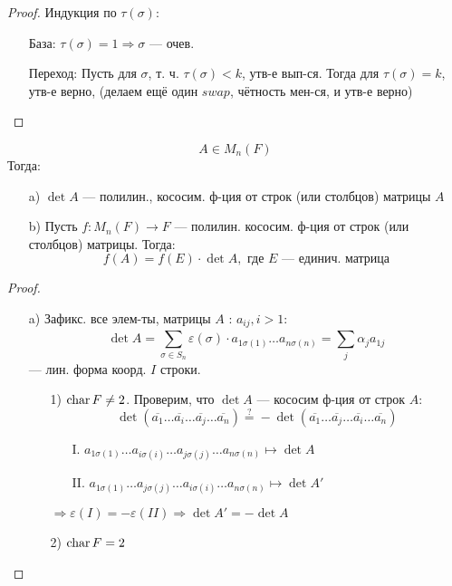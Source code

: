 \begin{proof}
  Индукция по $\tau(\sigma)$:
  \begin{itemize}
    \item [База: ] $\tau(\sigma) = 1 \Rightarrow \sigma$ --- очев.
    \item [Переход:] Пусть для $\sigma$, т. ч. $\tau(\sigma) < k$, утв-е вып-ся. Тогда для $\tau(\sigma) = k$, утв-е верно, (делаем ещё один $swap$, чётность мен-ся, и утв-е верно)
  \end{itemize}
\end{proof}
\begin{theorem}
\label{th:polilin_and_kos_1}
\[
A \in M_n(F)
\]
Тогда:
\begin{itemize}
  \item [a) ] $\det A$ --- полилин., кососим. ф-ция от строк (или столбцов) матрицы $A$
  \item [b) ] Пусть $f \colon M_n(F) \rightarrow F$ --- полилин. кососим. ф-ция от строк (или столбцов) матрицы. Тогда:
    \[
    f(A) = f(E) \cdot \det A, \text{ где $E$ --- единич. матрица}
    \]
\end{itemize}
\begin{proof}
  \begin{itemize}
    \item [a) ] Зафикс. все элем-ты, матрицы $A$ : $a_{ij}, i > 1$:
      \[
      \det A = \sum_{\sigma \in S_n}^{} \varepsilon(\sigma) \cdot a_{1 \sigma(1)} \ldots a_{n \sigma(n)} = \sum_{j}^{} \alpha_j a_{1j}
      \]
      --- лин. форма коорд. $I$ строки. \\
      \begin{itemize}
        \item [1)]
    $\operatorname{char} F \neq 2$. Проверим, что $\det A$ --- кососим ф-ция от строк $A$:
    \[
    \det (\overline{a_1} \ldots \overline{a_i} \ldots \overline{a_j} \ldots \overline{a_n}) \overset{?}{=} -\det (\overline{a_1} \ldots \overline{a_j} \ldots \overline{a_i} \ldots \overline{a_n})
    \]
    \begin{itemize}
      \item [I. ] $a_{1 \sigma(1)} \ldots a_{i \sigma(i)} \ldots a_{j \sigma(j)} \ldots a_{n \sigma(n)} \mapsto \det A$
      \item [II. ] $a_{1 \sigma(1)} \ldots a_{j \sigma(j)} \ldots a_{i \sigma(i)} \ldots a_{n \sigma(n)} \mapsto \det A'$
    \end{itemize}
     $\Rightarrow \varepsilon(I) = -\varepsilon(II) \Rightarrow \det A' = -\det A$
   \item [2) ] $\operatorname{char} F = 2$

\end{itemize}
\end{itemize}
\end{proof}
\end{theorem}

